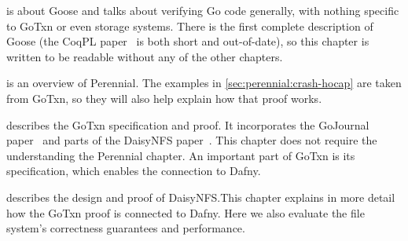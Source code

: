  is about Goose and talks about verifying Go code generally,
with nothing specific to GoTxn or even storage systems. There is the first
complete description of Goose (the CoqPL paper~\cite{chajed:goose-coqpl} is both
short and out-of-date), so this chapter is written to be readable without any of
the other chapters.

 is an overview of Perennial. The examples in
\cref{sec:perennial:crash-hocap} are taken from GoTxn, so they will also help
explain how that proof works.

 describes the GoTxn specification and proof. It incorporates the
GoJournal paper~\cite{chajed:gojournal} and parts of the DaisyNFS
paper~\cite{chajed:daisy-nfs}. This chapter does not require the understanding
the Perennial chapter. An important part of GoTxn is its specification, which
enables the connection to Dafny.

 describes the design and proof of DaisyNFS.\@ This chapter
explains in more detail how the GoTxn proof is connected to Dafny. Here we also
evaluate the file system's correctness guarantees and performance.
